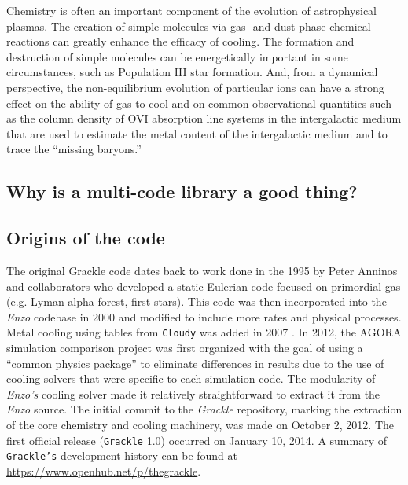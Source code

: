 Chemistry is often an important component of the evolution of
astrophysical plasmas.  The creation of simple molecules via gas- and
dust-phase chemical reactions can greatly enhance the efficacy of
cooling. \citep{1979ApJS...41..555H,2005ApJ...626..627O} The formation
and destruction of simple molecules can be energetically important in
some circumstances, such as Population III star formation.
\citep{1998ApJ...508..141O,2002Sci...295...93A,2008MNRAS.388.1627G,2009Sci...325..601T}
And, from a dynamical perspective, the non-equilibrium evolution of
particular ions can have a strong effect on the ability of gas to cool
\citep{1997NewA....2..181A,1997NewA....2..209A} and on common
observational quantities such as the column density of OVI absorption
line systems in the intergalactic medium that are used to estimate the
metal content of the intergalactic medium and to trace the ``missing
baryons.'' \citep{2006ApJ...650..573C,2011ApJ...731....6S,2013MNRAS.434.1043O,2014ApJ...796...49S}


\subsection{Why is a multi-code library a good thing?}


\subsection{Origins of the code}

The original Grackle code dates back to work done in
the 1995 by Peter Anninos and collaborators
\citep{1997NewA....2..209A} who developed a static Eulerian code
focused on primordial gas (e.g. Lyman alpha forest, first stars).
This code was then incorporated into the {\it Enzo} codebase in 2000
and modified to include more rates and physical processes.  Metal
cooling using tables from \texttt{Cloudy} was added in 2007
\citep{2008MNRAS.385.1443S}.  In 2012, the AGORA simulation comparison
project \citep{2014ApJS..210...14K} was first organized with the goal
of using a ``common physics package'' to eliminate differences in
results due to the use of cooling solvers that were specific to each
simulation code.  The modularity of {\it Enzo's} cooling solver made
it relatively straightforward to extract it from the {\it Enzo}
source.  The initial commit to the \textit{Grackle} repository,
marking the extraction of the core chemistry and cooling machinery,
was made on October 2, 2012.  The first official release
(\texttt{Grackle} 1.0) occurred on January 10, 2014.  A summary of
\texttt{Grackle's} development history can be found at
\url{https://www.openhub.net/p/thegrackle}.
